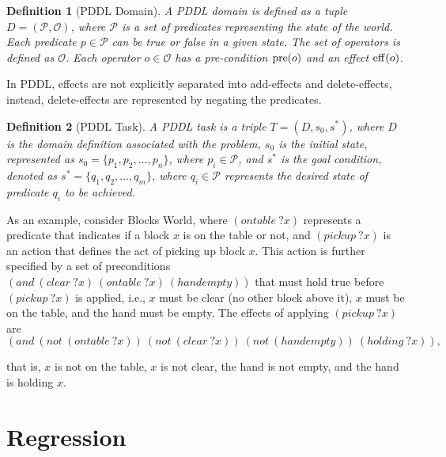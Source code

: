 \documentclass[ppgc,diss,english]{iiufrgs}
\newtheorem{definition}{Definition}
\begin{document}
\begin{definition}[PDDL Domain]\label{def:pddl-domain}
A PDDL domain is defined as a tuple $D = (\mathcal{P}, \mathcal{O})$, where $\mathcal{P}$ is a set of predicates representing the state of the world. Each predicate $p \in \mathcal{P}$ can be true or false in a given state. The set of operators is defined as $\mathcal{O}$. Each operator $o \in \mathcal{O}$ has a pre-condition $\operatorname{pre}(o)$ and an effect $\operatorname{eff}(o)$.
\end{definition}

In PDDL, effects are not explicitly separated into add-effects and delete-effects, instead, delete-effects are represented by negating the predicates.

\begin{definition}[PDDL Task]\label{def:pddl-domain}
A PDDL task is a triple $T = (D, s_{0}, s^{*})$, where $D$ is the domain definition associated with the problem, $s_{0}$ is the initial state, represented as $s_{0} = \{p_1, p_2, \ldots, p_n\}$, where $p_i \in \mathcal{P}$, and $s^{*}$ is the goal condition, denoted as $s^{*} = \{q_1, q_2, \ldots, q_m\}$, where $q_i \in \mathcal{P}$ represents the desired state of predicate $q_i$ to be achieved.
\end{definition}


As an example, consider Blocks World, where $(ontable~?x)$ represents a predicate that indicates if a block $x$ is on the table or not, and $(pickup~?x)$ is an action that defines the act of picking up block $x$. This action is further specified by a set of preconditions $(and~(clear~?x)~(ontable~?x)~(handempty))$ that must hold true before $(pickup~?x)$ is applied, i.e., $x$ must be clear (no other block above it), $x$ must be on the table, and the hand must be empty. The effects of applying $(pickup~?x)$ are $$(and~(not~(ontable~?x))~(not~(clear~?x))~(not~(handempty))~(holding~?x)),$$

that is, $x$ is not on the table, $x$ is not clear, the hand is not empty, and the hand is holding $x$.

\section{Regression}
\label{background-regression}
\end{document}
